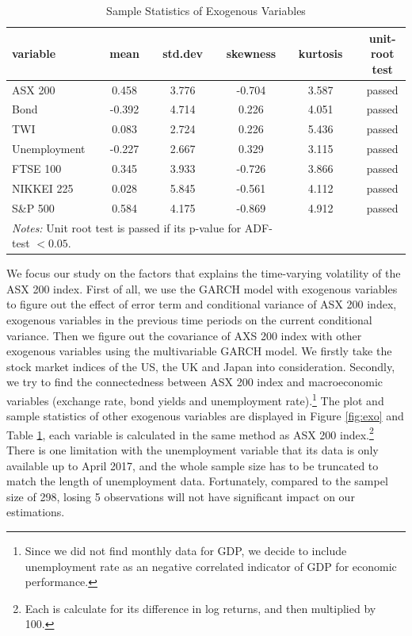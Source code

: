 \documentclass[11pt]{article}
\begin{document}
\begin{table}[H]
	\centering
	\caption{Sample Statistics of Exogenous Variables}
	\begin{tabular}{l l c c c c c c c c  c}
		\hline\hline 
		variable &&	mean && std.dev && skewness && kurtosis && unit-root test \\
		\hline
		ASX 200		&& 0.458  && 3.776  && -0.704 && 3.587 && passed \\
		Bond 		&&	-0.392 && 4.714 && 0.226 && 4.051 && passed \\	
		TWI 		&&	0.083 && 2.724 && 0.226  && 5.436 && passed \\
		Unemployment &&	-0.227 && 2.667 && 0.329 && 3.115 && passed \\
		FTSE 100 	&&	0.345 && 3.933 && -0.726 && 3.866 && passed \\
		NIKKEI 225 	&&	0.028 && 5.845 && -0.561 && 4.112 && passed \\
		S\&P 500 	&&	0.584 && 4.175 && -0.869 && 4.912 && passed \\
		\hline
		\multicolumn{7}{l}{{\footnotesize \textit{Notes:} Unit root test is passed if its p-value for ADF-test $<0.05$.}}	
	\end{tabular}
	\label{tab:exo}
\end{table}
We focus our study on the factors that explains the time-varying volatility of the ASX 200 index. First of all, we use the GARCH model with exogenous variables to figure out the effect of error term and conditional variance of ASX 200 index, exogenous variables in the previous time periods on the current conditional variance. Then we figure out the covariance of AXS 200 index with other exogenous variables using the multivariable GARCH model. We firstly take the stock market indices of the US, the UK and Japan into consideration. Secondly, we try to find the connectedness between ASX 200 index and macroeconomic variables (exchange rate, bond yields and unemployment rate).\footnote{Since we did not find monthly data for GDP, we decide to include unemployment rate as an negative correlated indicator of GDP for economic performance.} The plot and sample statistics of other exogenous variables are displayed in Figure \ref{fig:exo} and Table \ref{tab:exo}, each variable is calculated in the same method as ASX 200 index.\footnote{Each is calculate for its difference in log returns, and then multiplied by 100. } There is one limitation with the unemployment variable that its data is only available up to April 2017, and the whole sample size has to be truncated to match the length of unemployment data. Fortunately, compared to the sampel size of 298, losing 5 observations will not have significant impact on our estimations.
\end{document}
